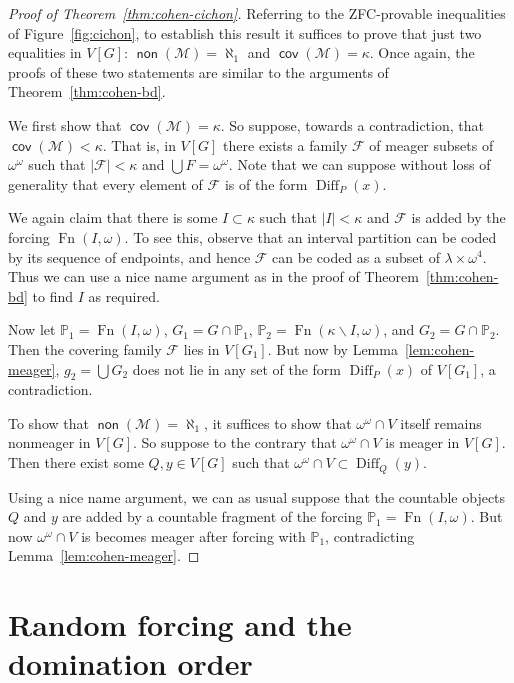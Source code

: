 \documentclass[11pt,oneside]{amsbook}
\newcommand{\PP}{\mathbb P}
\newcommand{\Meager}{\mathcal M}
\DeclareMathOperator{\non}{\mathsf{non}}
\DeclareMathOperator{\cov}{\mathsf{cov}}
\DeclareMathOperator{\Diff}{Diff}
\DeclareMathOperator{\Fn}{Fn}
\theoremstyle{definition}
\theoremstyle{plain}
\theoremstyle{definition}
\theoremstyle{remark}
\begin{document}
\begin{proof}[Proof of Theorem~\ref{thm:cohen-cichon}]
  Referring to the ZFC-provable inequalities of Figure~\ref{fig:cichon}, to establish this result it suffices to prove that just two equalities in $V[G]$: $\non(\Meager)=\aleph_1$ and $\cov(\Meager)=\kappa$. Once again, the proofs of these two statements are similar to the arguments of Theorem~\ref{thm:cohen-bd}.

  We first show that $\cov(\Meager)=\kappa$. So suppose, towards a contradiction, that $\cov(\Meager)<\kappa$. That is, in $V[G]$ there exists a family $\mathcal F$ of meager subsets of $\omega^\omega$ such that $|\mathcal F|<\kappa$ and $\bigcup F=\omega^\omega$.  Note that we can suppose without loss of generality that every element of $\mathcal F$ is of the form $\Diff_P(x)$.

  We again claim that there is some $I\subset\kappa$ such that $|I|<\kappa$ and $\mathcal F$ is added by the forcing $\Fn(I,\omega)$. To see this, observe that an interval partition can be coded by its sequence of endpoints, and hence $\mathcal F$ can be coded as a subset of $\lambda\times\omega^4$. Thus we can use a nice name argument as in the proof of Theorem~\ref{thm:cohen-bd} to find $I$ as required.

  Now let $\PP_1=\Fn(I,\omega)$, $G_1=G\cap\PP_1$, $\PP_2=\Fn(\kappa\smallsetminus I,\omega)$, and $G_2=G\cap\PP_2$. Then the covering family $\mathcal F$ lies in $V[G_1]$. But now by Lemma~\ref{lem:cohen-meager}, $g_2=\bigcup G_2$ does not lie in any set of the form $\Diff_P(x)$ of $V[G_1]$, a contradiction.

  To show that $\non(\Meager)=\aleph_1$, it suffices to show that $\omega^\omega\cap V$ itself remains nonmeager in $V[G]$. So suppose to the contrary that $\omega^\omega\cap V$ is meager in $V[G]$. Then there exist some $Q,y\in V[G]$ such that $\omega^\omega\cap V\subset\Diff_Q(y)$.

  Using a nice name argument, we can as usual suppose that the countable objects $Q$ and $y$ are added by a countable fragment of the forcing $\PP_1=\Fn(I,\omega)$. But now $\omega^\omega\cap V$ is becomes meager after forcing with $\PP_1$, contradicting Lemma~\ref{lem:cohen-meager}.
\end{proof}



\section{Random forcing and the domination order}
\end{document}
